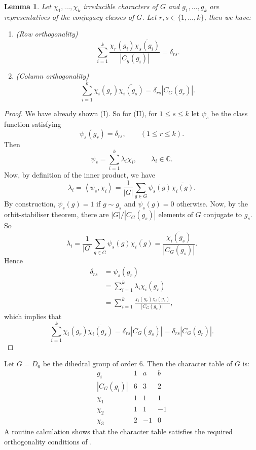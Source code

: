 \documentclass[11pt, notitlepage]{article}
\numberwithin{equation}{section}
\theoremstyle{plain}
\newtheorem{lemma}[theorem]{Lemma}
\theoremstyle{definition}
\newenvironment{example}
	{\pushQED{\qed}\renewcommand{\qedsymbol}{$\blacktriangleleft$}\examplex}
	{\popQED\endexamplex}
\newcommand{\C}{\mathbb{C}}
\newcommand{\inner}[2]{\left\langle #1,#2 \right\rangle}
\begin{document}
\begin{lemma}
Let $\chi_1,\dots,\chi_k$ irreducible characters of $G$ and $g_1,\dots,g_k$ are representatives of the conjugacy classes of $G$. Let $r,s \in \{1,\dots,k\}$, then we have:
\begin{enumerate}[label=\emph{(\Roman*)}]
    \item \emph{(Row orthogonality)}
    \[
        \sum_{i=1}^k \frac{\chi_r(g_i)\overline{\chi_s(g_i)}}{|C_g(g_i)|} = \delta_{rs}.
    \]
    \item \emph{(Column orthogonality)}
    \[
        \sum_{i=1}^k \chi_i(g_r)\overline{\chi_i(g_s)} = \delta_{rs}|C_G(g_r)|.
    \]
\end{enumerate}
\end{lemma}

\begin{proof}
We have already shown (I). So for (II), for $1 \le s \le k$ let $\psi_s$ be the class function satisfying
\[
    \psi_s(g_r) = \delta_{rs}, \qquad (1 \le r \le k).
\]
Then
\[
    \psi_s = \sum_{i=1}^k \lambda_i \chi_i, \qquad \lambda_i \in \C.
\]
Now, by definition of the inner product, we have
\[
    \lambda_i = \inner{\psi_s}{\chi_i} = \frac{1}{|G|} \sum_{g \in G}\psi_s(g) \overline{\chi_i(g)}.
\]
By construction, $\psi_s(g) = 1$ if $g \sim g_s$ and $\psi_s(g) = 0$ otherwise. Now, by the orbit-stabiliser theorem, there are $|G|/|C_G(g_s)|$ elements of $G$ conjugate to $g_s$. So
\[
    \lambda_i = \frac{1}{|G|} \sum_{g \in G}\psi_s(g) \overline{\chi_i(g)} = \frac{\overline{\chi_i(g_s)}}{|C_G(g_s)|}.
\]
Hence
\begin{align*}
    \delta_{rs} &= \psi_s(g_r)\\
    &= \sum_{i=1}^k\lambda_i\chi_i(g_r)\\
    &= \sum_{i=1}^k \frac{\chi_i(g_r)\overline{\chi_i(g_s)}}{|C_G(g_s)|},
\end{align*}
which implies that
\[
    \sum_{i=1}^k \chi_i(g_r)\overline{\chi_i(g_s)} = \delta_{rs}|C_G(g_s)| = \delta_{rs}|C_G(g_r)|.
\]
\end{proof}

\begin{example}
Let $G = D_6$ be the dihedral group of order 6. Then the character table of $G$ is:
\[
    \begin{array}{c|rrr}
        g_i        & 1 & a  & b  \\\hline
        |C_G(g_i)| & 6 & 3  & 2 \\\hline
        \chi_1     & 1 & 1  & 1 \\
        \chi_2     & 1 & 1  & -1\\
        \chi_3     & 2 & -1 & 0
    \end{array}
\]
A routine calculation shows that the character table satisfies the required orthogonality conditions of .
\end{example}
\end{document}
